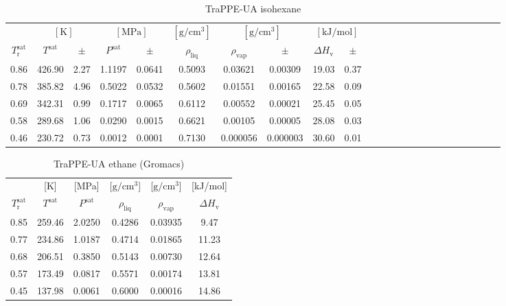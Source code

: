 \documentclass[%
 aip,
 jcp,
 sd,%
 amsmath,amssymb,
]{revtex4-1}
\begin{document}
\begin{table*}[]
\centering
\caption{
TraPPE-UA isohexane
}
\label{tab:TraPPE-iC6-trappegc}
\begin{ruledtabular}
\begin{tabular}{cccccccccccccccccccccccc}
 & \multicolumn{2}{c}{$[\mathrm{K}]$} &	 \multicolumn{2}{c}{$[\mathrm{MPa}]$} & $[\mathrm{g/cm^3}]$ & \multicolumn{2}{c}{$[\mathrm{g/cm^3}]$} & \multicolumn{2}{c}{$[\mathrm{kJ/mol}]$} \\
$T_\mathrm{r}^{\mathrm{sat}}$ & $T^{\mathrm{sat}}$ & $\pm$ & $P^{\mathrm{sat}}$ & $\pm$ & $\rho_{\mathrm{liq}}$ & $\rho_{\mathrm{vap}}$ & $\pm$ & $\Delta H_{\mathrm{v}}$ & $\pm$
 \\
\hline		
0.86	&	426.90	&	2.27	&	1.1197	&	0.0641	&	0.5093	&	0.03621	&	0.00309	&	19.03	&	0.37	\\
0.78	&	385.82	&	4.96	&	0.5022	&	0.0532	&	0.5602	&	0.01551	&	0.00165	&	22.58	&	0.09	\\
0.69	&	342.31	&	0.99	&	0.1717	&	0.0065	&	0.6112	&	0.00552	&	0.00021	&	25.45	&	0.05	\\
0.58	&	289.68	&	1.06	&	0.0290	&	0.0015	&	0.6621	&	0.00105	&	0.00005	&	28.08	&	0.03	\\
0.46	&	230.72	&	0.73	&	0.0012	&	0.0001	&	0.7130	&	0.000056	&	0.000003	&	30.60	&	0.01	\\
\end{tabular}
\end{ruledtabular}
\end{table*}

\begin{table*}[!htbp]
\centering
\caption{
TraPPE-UA ethane (Gromacs)
}
\label{tab:TraPPE-C2-trappe-gmx}
\begin{ruledtabular}
\begin{tabular}{cccccc}
 & {[}K{]} &	 {[}MPa{]} & {[}$\mathrm{g/cm^3}${]} & {[}$\mathrm{g/cm^3}${]}	& {[}kJ/mol{]}  \\
$T_\mathrm{r}^{\mathrm{sat}}$ & $T^{\mathrm{sat}}$ & $P^{\mathrm{sat}}$ & $\rho_{\mathrm{liq}}$ & $\rho_{\mathrm{vap}}$ & $\Delta H_{\mathrm{v}}$ \\
\hline													
0.85	&	259.46	&	2.0250	&	0.4286	&	0.03935	&	9.47	\\
0.77	&	234.86	&	1.0187	&	0.4714	&	0.01865	&	11.23	\\
0.68	&	206.51	&	0.3850	&	0.5143	&	0.00730	&	12.64	\\
0.57	&	173.49	&	0.0817	&	0.5571	&	0.00174	&	13.81	\\
0.45	&	137.98	&	0.0061	&	0.6000	&	0.00016	&	14.86	\\
\end{tabular}
\end{ruledtabular}
\end{table*}
\end{document}
